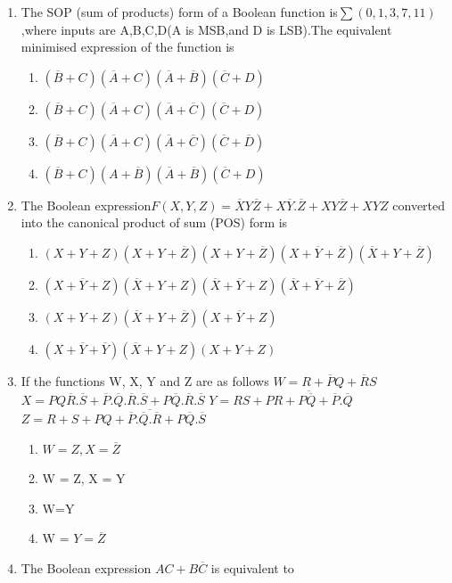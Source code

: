 \documentclass[journal,12pt,twocolumn]{IEEEtran}
\begin{document}
\begin{enumerate}
\item The SOP (sum of products) form of a Boolean function is$\sum(0,1,3,7,11)$,where inputs are A,B,C,D(A is MSB,and D is LSB).The equivalent minimised expression of the function is  
      \begin{enumerate}
      \item $(\overline{B}+C)(\overline{A}+C)(\overline{A}+\overline{B})(\overline{C}+D)$
      \item $(\overline{B}+C)(\overline{A}+C)(\overline{A}+\overline{C})(\overline{C}+D)$
      \item $(\overline{B}+C)(\overline{A}+C)(\overline{A}+\overline{C})(\overline{C}+\overline{D})$
      \item $(\overline{B}+C)(A+\overline{B})(\overline{A}+\overline{B})(\overline{C}+D)$
      \end{enumerate}
\item The Boolean expression$F(X,Y,Z)=\overline{X}Y\overline{Z}+X\overline{Y}.\overline{Z}+XY\overline{Z}+XYZ $ converted into the canonical product of sum (POS) form is
      \begin{enumerate}
      \item $(X+Y+Z)(X+Y+\overline{Z})(X+Y+\overline{Z})(X+\overline{Y}+\overline{Z})(\overline{X}+Y+\overline{Z})$
      \item $(X+\overline{Y}+Z)(\overline{X}+Y+Z)(\overline{X}+\overline{Y}+Z)(\overline{X}+\overline{Y}+\overline{Z})$
      \item $(X+Y+Z)(\overline{X}+Y+\overline{Z})(X+\overline{Y}+Z)$
      \item $(X+\overline{Y}+\overline{Y})(\overline{X}+Y+Z)(X+Y+Z)$
      \end{enumerate}
\item If the functions W, X, Y and Z are as follows $W=R+\overline{P}Q+\overline{R}S$
$X=PQ\overline{R}.\overline{S}+\overline{P}.\overline{Q}.\overline{R}.
\overline{S}+P\overline{Q}.\overline{R}.\overline{S}$ $Y=RS+\overline{PR+P\overline{Q}+\overline{P}.\overline{Q}}$ $Z=R+S+\overline{PQ+\overline{P}.\overline{Q}.\overline{R}+P\overline{Q}.\overline{S}}$
     \begin{enumerate}
      \item $W = Z, X =\overline{Z}$ 
      \item W = Z, X = Y
      \item W=Y
      \item W = $Y =\overline{Z}$
     \end{enumerate}
\item The Boolean expression $AC +B\overline{C}$ is equivalent to

\end{enumerate}
\end{document}
